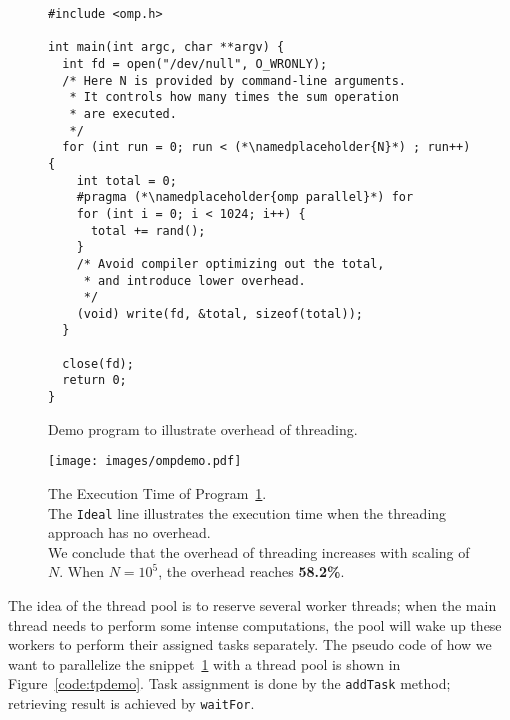 \begin{figure}[ht]
    \centering
\begin{lstlisting}[frame=tlbr]
#include <omp.h>

int main(int argc, char **argv) {
  int fd = open("/dev/null", O_WRONLY);
  /* Here N is provided by command-line arguments. 
   * It controls how many times the sum operation
   * are executed.
   */
  for (int run = 0; run < (*\namedplaceholder{N}*) ; run++) {
    int total = 0;
    #pragma (*\namedplaceholder{omp parallel}*) for
    for (int i = 0; i < 1024; i++) {
      total += rand();
    }
    /* Avoid compiler optimizing out the total,
     * and introduce lower overhead.
     */
    (void) write(fd, &total, sizeof(total));
  }

  close(fd);
  return 0;
}
\end{lstlisting}
    \caption{Demo program to illustrate overhead of threading.}
    \label{code:ompdemo}
\end{figure}

\begin{figure}[ht]
    \centering
    \texttt{[image: images/ompdemo.pdf]}
    \caption{The Execution Time of Program~\ref{code:ompdemo}. \\
        The \texttt{Ideal} line illustrates the execution time when the threading
        approach has no overhead. \\
        We conclude that the overhead of threading increases with scaling of $N$.
        When $N = 10^5$, the overhead reaches \textbf{58.2\%}. }
    \label{fig:ompdemo}
\end{figure}

\par The idea of the thread pool is to reserve several worker threads; when the
main thread needs to perform some intense computations, the pool will wake up
these workers to perform their assigned tasks separately. The pseudo code of how
we want to parallelize the snippet~\ref{code:ompdemo} with a thread pool
is shown in Figure~\ref{code:tpdemo}. Task assignment is done by the \texttt{addTask}
method; retrieving result is achieved by \texttt{waitFor}.

